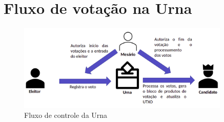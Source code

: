 \chapter{Fluxo de votação na Urna}

\begin{figure}[h!]
	\centering
	\includegraphics[width=0.9\textwidth]{imagens/fluxo_urna}
	\caption{Fluxo de controle da Urna}
	\label{fig:fluxo_urna}
\end{figure}